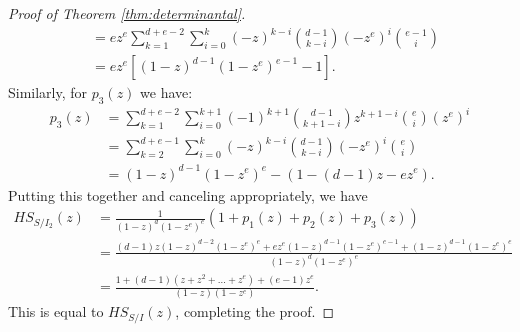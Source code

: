 \documentclass[10pt,a4paper]{amsart}
\begin{document}
\begin{proof}[Proof of Theorem \ref{thm:determinantal}]
\begin{align*}
&= ez^e\sum_{k=1}^{d+e-2}\sum_{i=0}^{k}(-z)^{k-i}\binom{d-1}{k-i}(-z^e)^i\binom{e-1}{i}\\
&= ez^e\left[(1-z)^{d-1}(1-z^e)^{e-1}-1\right].
\end{align*}
Similarly, for $p_3(z)$ we have:
\begin{align*}
p_3(z)&=\sum_{k=1}^{d+e-2}\sum_{i=0}^{k+1}(-1)^{k+1}\binom{d-1}{k+1-i}z^{k+1-i}\binom{e}{i}(z^e)^i\\
&= \sum_{k=2}^{d+e-1}\sum_{i=0}^{k}(-z)^{k-i}\binom{d-1}{k-i}(-z^e)^i\binom{e}{i}\\
&= (1-z)^{d-1}(1-z^e)^e - (1-(d-1)z-ez^e).
\end{align*}
Putting this together and canceling appropriately, we have
\begin{align*}
HS_{S/I_2}(z) &= \frac{1}{(1-z)^d(1-z^e)^e}\left( 1+p_1(z)+p_2(z)+p_3(z)\right)\\
&=\frac{(d-1)z(1-z)^{d-2}(1-z^e)^e+ez^e(1-z)^{d-1}(1-z^e)^{e-1}+ (1-z)^{d-1}(1-z^e)^e}{(1-z)^d(1-z^e)^e}\\
&= \frac{1+(d-1)(z+z^2+\ldots+z^e)+(e-1)z^e}{(1-z)(1-z^e)}.
\end{align*}
This is equal to $HS_{S/I}(z)$, completing the proof.
\end{proof}
\end{document}

